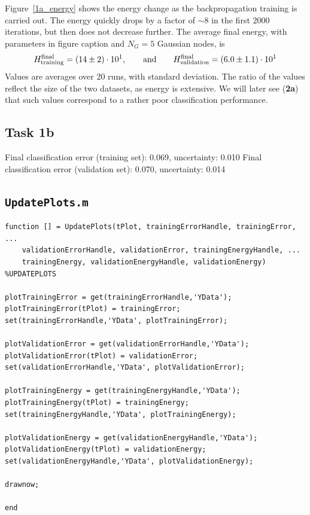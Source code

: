 \documentclass[12pt,titlepage]{article}
\begin{document}
Figure~\ref{1a_energy} shows the energy change as the backpropagation training is carried out. The energy quickly drops by a factor of $\sim8$ in the first 2000 iterations, but then does not decrease further. The average final energy, with parameters in figure caption and $N_G = 5$ Gaussian nodes, is
\[
H_{\textup{training}}^{\textup{final}} = (14 \pm 2)\cdot 10^1, \qquad \mbox{and} \qquad H_{\textup{validation}}^{\textup{final}} = (6.0 \pm 1.1)\cdot 10^1
\]
Values are averages over 20 runs, with standard deviation. The ratio of the values reflect the size of the two datasets, as energy is extensive. We will later see (\textbf{2a}) that such values correspond to a rather poor classification performance.

\clearpage
\subsection*{Task 1b}

Final classification error (training set): 0.069, uncertainty: 0.010
  Final classification error (validation set): 0.070, uncertainty: 0.014
  
  
\clearpage

\appendix

\subsection*{\texttt{UpdatePlots.m}}

\begin{lstlisting}
function [] = UpdatePlots(tPlot, trainingErrorHandle, trainingError, ...
    validationErrorHandle, validationError, trainingEnergyHandle, ...
    trainingEnergy, validationEnergyHandle, validationEnergy)
%UPDATEPLOTS

plotTrainingError = get(trainingErrorHandle,'YData');
plotTrainingError(tPlot) = trainingError;
set(trainingErrorHandle,'YData', plotTrainingError);

plotValidationError = get(validationErrorHandle,'YData');
plotValidationError(tPlot) = validationError;
set(validationErrorHandle,'YData', plotValidationError);

plotTrainingEnergy = get(trainingEnergyHandle,'YData');
plotTrainingEnergy(tPlot) = trainingEnergy;
set(trainingEnergyHandle,'YData', plotTrainingEnergy);

plotValidationEnergy = get(validationEnergyHandle,'YData');
plotValidationEnergy(tPlot) = validationEnergy;
set(validationEnergyHandle,'YData', plotValidationEnergy);

drawnow;

end
\end{lstlisting}
\end{document}
